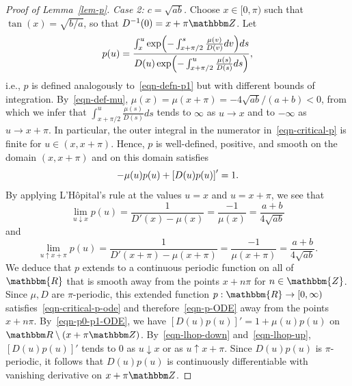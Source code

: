 \documentclass[11pt]{article}
\theoremstyle{plain}
\theoremstyle{definition}
\numberwithin{equation}{section}
\newcommand{\eqb}{\begin{equation}}
\newcommand{\eqe}{\end{equation}}
\newcommand{\BB}{\mathbbm}
\newcommand{\rta}{\rightarrow}
\let\originalleft\left
\let\originalright\right
\renewcommand{\left}{\mathopen{}\mathclose\bgroup\originalleft}
\renewcommand{\right}{\aftergroup\egroup\originalright}
\begin{document}
\begin{proof}[Proof of Lemma~\ref{lem-p}]
\noindent \emph{Case 2: $c = \sqrt{ab}$.}
Choose $x \in [0,\pi)$ such that $\tan(x) = \sqrt{b/a}$, so that $D^{-1}(0) = x + \pi \BB Z$. 
Let 
\eqb \label{eqn-critical-p}
p (u) = \frac{\int_x^u \exp\left(-\int_{x+\pi/2}^s \frac{\mu(v)}{D(v)} dv \right) ds}{D(u) \exp\left(-\int_{x+\pi/2}^u \frac{\mu(s)}{D(s)} ds \right)} , 
\eqe
i.e., $p$ is defined analogously to~\eqref{eqn-defn-p1} but with different bounds of integration. By~\eqref{eqn-def-mu}, $\mu(x) = \mu(x+\pi) = -4\sqrt{ab}/(a+b) < 0$, from which we infer that $\int_{x+\pi/2}^u \frac{\mu(s)}{D(s)} ds$ tends to $\infty$ as $u\rta x$ and to $-\infty$ as $u\rta x+\pi$. In particular, the outer integral in the numerator in~\eqref{eqn-critical-p} is finite for $u\in (x,x+\pi)$. 
Hence, $p$ is well-defined, positive, and smooth on the domain $(x,x+\pi)$ and on this domain satisfies 
\eqb \label{eqn-critical-p-ode}
-\mu(u) p (u) +  \left[ D(u) p(u) \right]' = 1  .
\eqe
By applying L'H\^opital's rule at the values $u=x$ and $u=x+\pi$, we see that 
\eqb \label{eqn-lhop-down}
\lim_{u \downarrow x} p (u) = \frac{1}{D'(x) - \mu(x)} = \frac{-1}{\mu(x)}  = \frac{a+b}{4\sqrt{ab}}  
\eqe
and  
\eqb \label{eqn-lhop-up}
\lim_{u \uparrow x+\pi} p (u) = \frac{1}{D'(x+\pi) - \mu(x+\pi)} =  \frac{-1}{\mu(x+\pi)}  = \frac{a+b}{4\sqrt{ab}}   .
\eqe  
We deduce that $p $ extends to a continuous periodic function on all of $\BB{R}$ that is smooth away from the points $x+n\pi$ for $n \in \BB{Z}$.  Since $\mu,D$ are $\pi$-periodic, this extended function $p :\BB{R} \rta [0,\infty)$ satisfies~\eqref{eqn-critical-p-ode} and therefore~\eqref{eqn-p-ODE} away from the points $x+n\pi$. By~\eqref{eqn-p0-p1-ODE}, we have $[D(u)p (u)]' = 1 + \mu(u) p (u)$ on $\BB R\setminus (x+\pi \BB Z)$. By~\eqref{eqn-lhop-down} and~\eqref{eqn-lhop-up}, $[D(u)p (u)]'$ tends to 0 as $u\downarrow x$ or as $u\uparrow x + \pi$. Since $D(u) p (u)$ is $\pi$-periodic, it follows that $D(u) p (u)$ is continuously differentiable with vanishing derivative on $x + \pi\BB Z$. %
\end{proof}

\end{document}

